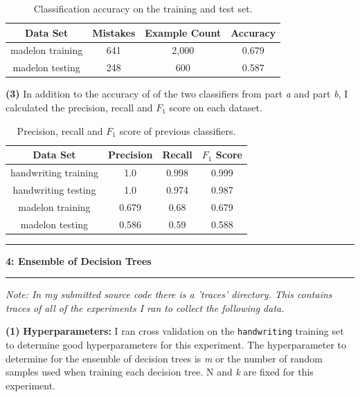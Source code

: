 \documentclass[11pt]{article}
\newcommand\question[2]{\vspace{.25in}\hrule\textbf{#1: #2}\vspace{.5em}\hrule\vspace{.10in}}
\renewcommand\part[1]{\vspace{.10in}\textbf{(#1)}}
\begin{document}
 \begin{table}[H]
\centering
{\renewcommand{\arraystretch}{1.2}%
\begin{tabular}{| c | c | c | c |}
\hline
Data Set & Mistakes & Example Count & Accuracy\\
\hline
madelon training & 641 & 2,000 & 0.679\\ \hline
madelon testing & 248 & 600 & 0.587\\ \hline
\end{tabular}}
\caption{Classification accuracy on the training and test set.}
\end{table}

\part{3} In addition to the accuracy of of the two classifiers from part \textit{a} and part \textit{b}, I calculated the precision, recall and $F_1$ score on each dataset.

 \begin{table}[H]
\centering
{\renewcommand{\arraystretch}{1.2}%
\begin{tabular}{| c | c | c | c |}
\hline
Data Set & Precision & Recall & $F_1$ Score\\
\hline
handwriting training & 1.0 & 0.998 & 0.999\\ \hline
handwriting testing & 1.0 & 0.974 & 0.987\\ \hline
madelon training & 0.679 & 0.68 & 0.679\\ \hline
madelon testing & 0.586 & 0.59 & 0.588\\ \hline
\end{tabular}}
\caption{Precision, recall and $F_1$ score of previous classifiers.}
\end{table}

\question{4}{Ensemble of Decision Trees}
\textit{Note: In my submitted source code there is a 'traces' directory. This contains traces of all of the experiments I ran to collect the following data.}

\part{1} \textbf{Hyperparameters:} I ran cross validation on the {\tt handwriting} training set to determine good hyperparameters for this experiment. The hyperparameter to determine for the ensemble of decision trees is \textit{m} or the number of random samples used when training each decision tree. N and \textit{k} are fixed for this experiment.
	
\end{document}
